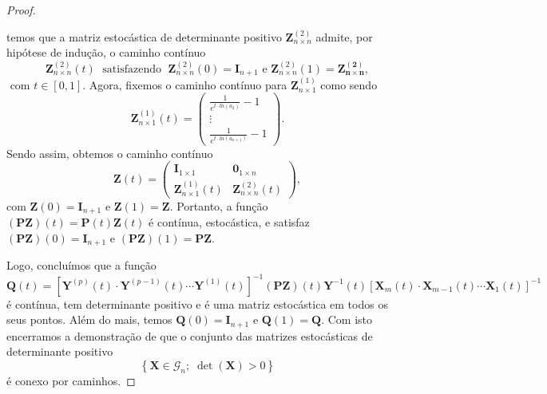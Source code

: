 \documentclass[twoside,openright,titlepage,numbers=noenddot,headinclude,  lineheaders footinclude=true,cleardoublepage=empty,
                                BCOR=5mm,paper=a4,fontsize=12pt ]{scrbook}
\theoremstyle{definition}
\begin{document}
\begin{proof}
\begin{itemize}
\[\]
temos que a matriz estocástica
de determinante positivo $\mathbf{Z}_{n \times n}^{(2)}$ admite,
por hipótese de indução, o caminho contínuo
\[
\mathbf{Z}_{n \times n}^{(2)}(t) \;\text{ satisfazendo }\;
\mathbf{Z}_{n \times n}^{(2)}(0) = \mathbf{I}_{n+1} \text{ e }
\mathbf{Z}_{n \times n}^{(2)}(1) = \mathbf{{Z}_{n \times n}^{(2)}},
\]
$ \text{ com } t \in [0,1] $.
Agora, fixemos o caminho contínuo para 
$\mathbf{Z}_{n \times 1}^{(1)}$ como sendo
\[
\mathbf{Z}_{n \times 1}^{(1)}(t) = 
\begin{pmatrix}
\frac{1}{e^{t \cdot ln(a_2)}} - 1
\\
\vdots
\\
\frac{1}
{e^{t \cdot ln(a_{n+1})}} - 1
\end{pmatrix}
.
\]
Sendo assim, obtemos o caminho contínuo
\[
\mathbf{Z}(t) = 
\begin{pmatrix}
\mathbf{I}_{1 \times 1} & \mathbf{0}_{1 \times n} \\
\mathbf{Z}_{n \times 1}^{(1)}(t) & \mathbf{Z}_{n \times n}^{(2)}(t)
\end{pmatrix}
,
\]
com $
\mathbf{Z}(0) = \mathbf{I}_{n+1}$ e 
$\mathbf{Z}(1) = \mathbf{Z}$.
Portanto, a função $(\mathbf{PZ})(t) = \mathbf{P}(t) \mathbf{Z}(t) $
é contínua, estocástica, e satisfaz 
$(\mathbf{PZ})(0) = \mathbf{I}_{n+1}$ e 
$(\mathbf{PZ})(1) = \mathbf{PZ}$. 
\end{itemize}

Logo, concluímos que a função
\[
\mathbf{Q}(t) =
[\mathbf{Y}^{(p)}(t) \cdot \mathbf{Y}^{(p-1)}(t)
\cdots \mathbf{Y}^{(1)}(t) ]^{-1} 
(\mathbf{P} \mathbf{Z})(t) \mathbf{Y}^{-1}(t)
[\mathbf{X}_m(t) \cdot \mathbf{X}_{m-1}(t)  \cdots
 \mathbf{X}_1(t)]^{-1}
\]
é contínua, tem determinante positivo e é uma matriz estocástica
 em todos os seus pontos. Além do mais, temos 
$ \mathbf{Q}(0) = \mathbf{I}_{n+1}$ e 
$ \mathbf{Q}(1) = \mathbf{Q}$.
Com isto encerramos a demonstração de que o 
 conjunto das matrizes estocásticas de determinante positivo
\[
\left\{ \mathbf{X} \in \mathcal{G}_n; \; \det(\mathbf{X}) > 0 \right\}
\]
é conexo por caminhos.

\end{proof}
\end{document}
